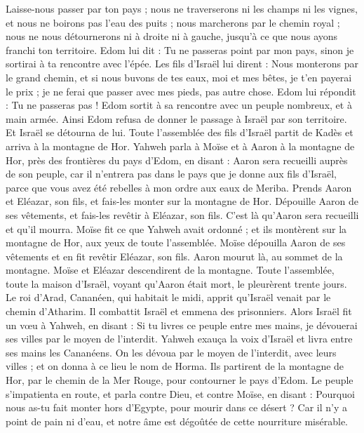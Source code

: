 \begin{multicols}{2}
Laisse-nous passer par ton pays ; nous ne traverserons ni les champs ni les vignes, et nous ne boirons pas l'eau des puits ; nous marcherons par le chemin royal ; nous ne nous détournerons ni à droite ni à gauche, jusqu'à ce que nous ayons franchi ton territoire.
Edom lui dit : Tu ne passeras point par mon pays, sinon je sortirai à ta rencontre avec l’épée.
Les fils d'Israël lui dirent : Nous monterons par le grand chemin, et si nous buvons de tes eaux, moi et mes bêtes, je t'en payerai le prix ; je ne ferai que passer avec mes pieds, pas autre chose.
Edom lui répondit : Tu ne passeras pas ! Edom sortit à sa rencontre avec un peuple nombreux, et à main armée.
Ainsi Edom refusa de donner le passage à Israël par son territoire. Et Israël se détourna de lui.
Toute l’assemblée des fils d'Israël partit de Kadès et arriva à la montagne de Hor.
Yahweh parla à Moïse et à Aaron à la montagne de Hor, près des frontières du pays d'Edom, en disant :
Aaron sera recueilli auprès de son peuple, car il n'entrera pas dans le pays que je donne aux fils d'Israël, parce que vous avez été rebelles à mon ordre aux eaux de Meriba.
Prends Aaron et Eléazar, son fils, et fais-les monter sur la montagne de Hor.
Dépouille Aaron de ses vêtements, et fais-les revêtir à Eléazar, son fils. C’est là qu’Aaron sera recueilli et qu’il mourra.
Moïse fit ce que Yahweh avait ordonné ; et ils montèrent sur la montagne de Hor, aux yeux de toute l'assemblée.
Moïse dépouilla Aaron de ses vêtements et en fit revêtir Eléazar, son fils. Aaron mourut là, au sommet de la montagne. Moïse et Eléazar descendirent de la montagne.
Toute l'assemblée, toute la maison d'Israël, voyant qu'Aaron était mort, le pleurèrent trente jours.
\VerseOne{}Le roi d’Arad, Cananéen, qui habitait le midi, apprit qu'Israël venait par le chemin d’Atharim. Il combattit Israël et emmena des prisonniers.
Alors Israël fit un vœu à Yahweh, en disant : Si tu livres ce peuple entre mes mains, je dévouerai ses villes par le moyen de l'interdit.
Yahweh exauça la voix d'Israël et livra entre ses mains les Cananéens. On les dévoua par le moyen de l’interdit, avec leurs villes ; et on donna à ce lieu le nom de Horma.
Ils partirent de la montagne de Hor, par le chemin de la Mer Rouge, pour contourner le pays d'Edom. Le peuple s’impatienta en route,
et parla contre Dieu, et contre Moïse, en disant : Pourquoi nous as-tu fait monter hors d'Egypte, pour mourir dans ce désert ? Car il n’y a point de pain ni d'eau, et notre âme est dégoûtée de cette nourriture misérable.

\end{multicols}

